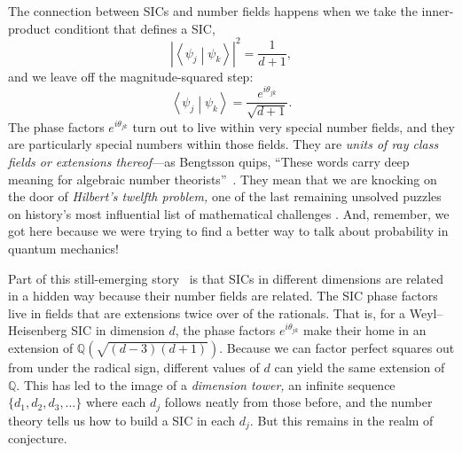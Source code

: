 \documentclass[aps,pra,superscriptaddress,10pt,tightenlines,twocolumn,nofootinbib]{revtex4}
\newcommand{\braket}[2]{{\ensuremath{\left\langle #1 \middle| #2
      \right\rangle}}}
\begin{document}
The connection between SICs and number fields happens when we take the
inner-product conditiont that defines a SIC,
\begin{equation}
\left|\braket{\psi_j}{\psi_k}\right|^2 = \frac{1}{d+1},
\end{equation}
and we leave off the magnitude-squared step:
\begin{equation}
\braket{\psi_j}{\psi_k} = \frac{e^{i\theta_{jk}}}{\sqrt{d+1}}.
\end{equation}
The phase factors $e^{i\theta_{jk}}$ turn out to live within very special
number fields, and they are particularly special numbers within those
fields.  They are {\it units of ray class fields or extensions
  thereof}---as Bengtsson quips, ``These words carry deep meaning for
algebraic number theorists''~\cite{Bengtsson16}.  They mean that we
are knocking on the door of {\it Hilbert's twelfth problem,} one of
the last remaining unsolved puzzles on history's most influential list
of mathematical challenges \cite{Schappacher98}.  And, remember, we got here because we
were trying to find a better way to talk about probability in quantum
mechanics!

Part of this still-emerging story~\cite{RCF-SIC} is that SICs in
different dimensions are related in a hidden way because their number
fields are related.  The SIC phase factors live in fields that are
extensions twice over of the rationals.  That is, for a
Weyl--Heisenberg SIC in dimension $d$, the phase factors
$e^{i\theta_{jk}}$ make their home in an extension of
$\mathbb{Q}\left(\sqrt{(d-3)(d+1)}\right)$.  Because we can factor perfect
squares out from under the radical sign, different values of $d$ can yield
the same extension of $\mathbb{Q}$.  This has led to the image of a {\it dimension
  tower,} an infinite sequence $\{d_1, d_2, d_3, \ldots\}$ where each
$d_j$ follows neatly from those before, and the number theory tells us
how to build a SIC in each $d_j$.  But this remains in the realm of
conjecture.
\end{document}
